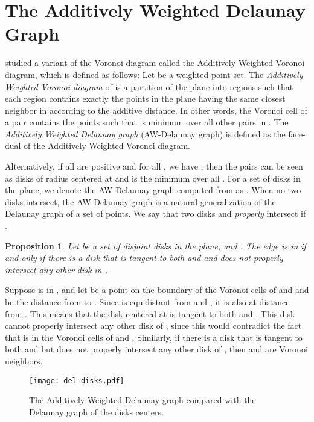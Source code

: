 \documentclass[pdftex,leqno,fleqn,12pt]{article}
\newtheorem{proposition}[theorem]{Proposition}
\newenvironment{proof}{{\textit Proof:} \rm}{\hfill  \medskip\\}
\begin{document}
\section{The Additively Weighted Delaunay Graph}\label{section-disk-del-spanning-ratio}


\citet{drysdale81} studied a variant of the Voronoi diagram called the Additively Weighted Voronoi
diagram, which is defined as follows: Let  be a weighted point set. The \emph{Additively
Weighted Voronoi diagram} of  is a partition of the plane into  regions such that each
region contains exactly the points in the plane having the same closest neighbor in  according
to the additive distance. In other words, the Voronoi cell of a pair  contains the
points  such that  is minimum over all other pairs in . The \emph{Additively
Weighted Delaunay graph} (AW-Delaunay graph) is defined as the face-dual of the Additively Weighted
Voronoi diagram.

Alternatively, if all  are positive and for all , we have , then
the pairs  can be seen as disks  of radius  centered at  and 
is the minimum  over all . For a set  of disks in the plane, we
denote the AW-Delaunay graph computed from  as . When no two disks
intersect, the AW-Delaunay graph is a natural generalization of the Delaunay graph of a set of
points. We say that two disks  and  \emph{properly} intersect if .


\begin{proposition}\label{prop-dual} Let  be a set of disjoint disks in the
plane, and . The edge  is in  if and only if there is
a disk  that is tangent to both  and  and does not properly intersect any other disk in
.
\end{proposition}
\begin{proof}Suppose  is in , and let 
be a point on the boundary of the Voronoi cells of  and  and  be the distance from  to
. Since  is equidistant from  and , it is also at distance  from . This means that
the disk  centered at  is tangent to both  and . This disk cannot properly intersect
any other disk of , since this would contradict the fact that  is in the Voronoi
cells of  and . Similarly, if there is a disk that is tangent to both  and  but does
not properly intersect any other disk of , then  and  are Voronoi neighbors.
\end{proof}

\begin{figure}
\centering
\texttt{[image: del-disks.pdf]}
\caption{The Additively Weighted Delaunay graph compared with the Delaunay graph of the disks
centers.}\label{fig-del-disks}
\end{figure}
\end{document}
